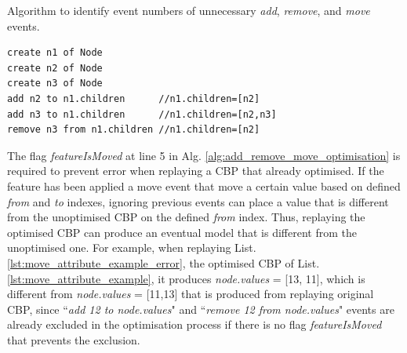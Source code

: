 \documentclass{llncs}
\begin{document}
\begin{algorithm}[H]
\begin{small}
\end{small}
\caption{Algorithm to identify event numbers of unnecessary \emph{add}, \emph{remove}, and \emph{move} events.}
\label{alg:add_remove_move_optimisation}
\end{algorithm}

\begin{lstlisting}[style=eol,caption={Example of CBP representation of attribute \emph{values}'s add and remove operations.},label=lst:add_remove_move_reference]
create n1 of Node
create n2 of Node
create n3 of Node
add n2 to n1.children      //n1.children=[n2] 
add n3 to n1.children      //n1.children=[n2,n3] 
remove n3 from n1.children //n1.children=[n2] 
\end{lstlisting}

The flag \emph{featureIsMoved} at line 5 in Alg. \ref{alg:add_remove_move_optimisation} is required to prevent error when replaying a CBP that already optimised. If the feature has been applied a move event that move a certain value based on defined \emph{from} and \emph{to} indexes, ignoring previous events can place a value that is different from the unoptimised CBP on the defined \emph{from} index. Thus, replaying the optimised CBP can produce an eventual model that is different from the unoptimised one. For example, when replaying List. \ref{lst:move_attribute_example_error}, the optimised CBP of List. \ref{lst:move_attribute_example}, it produces \emph{node.values} = [13, 11], which is different from \emph{node.values} = [11,13]  that is produced from replaying original CBP, since ``\emph{add 12 to node.values}" and ``\emph{remove 12 from node.values}" events are already excluded in the optimisation process if there is no flag \emph{featureIsMoved} that prevents the exclusion.
\end{document}
